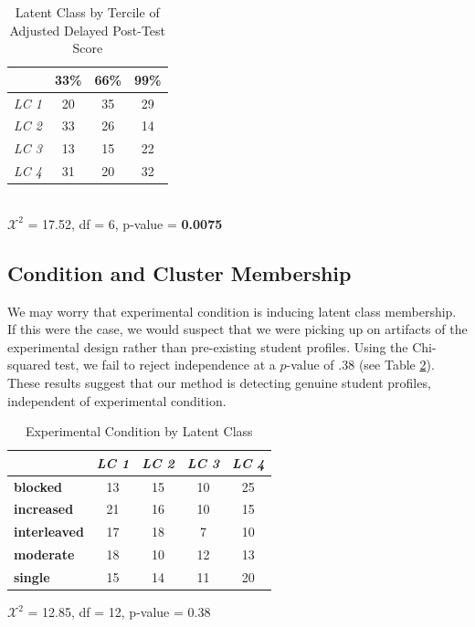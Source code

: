 \documentclass{edm_template}
\begin{document}
\begin{table}[hbtp]

\caption{Latent Class by Tercile of Adjusted Delayed Post-Test Score}
\begin{center}
\begin{tabular}{|l || c | c | c |}
\hline
&33\%&66\%&99\%\\ \hline \hline
  \emph{LC 1}  &   20& 35& 29 \\ \hline
  \emph{LC 2}&   33& 26& 14 \\ \hline
\emph{LC 3}& 13& 15& 22 \\ \hline
  \emph{LC 4} & 31& 20& 32 \\ \hline
 \end{tabular}
\\$\mathcal{X}^2$ = 17.52, df = 6, p-value = {\bf 0.0075}
\end{center}
\label{tab:lc-by-score}
\end{table}

\subsection{Condition and Cluster Membership}

We may worry that experimental condition is inducing latent class membership. If this were the case, we would suspect that we were picking up on artifacts of the experimental design rather than pre-existing student profiles. Using the Chi-squared test, we fail to reject independence at a $p$-value of $.38$ (see Table \ref{tab:exp-and-lc}). These results suggest that our method is detecting genuine student profiles, independent of experimental condition. 


\begin{table}[hbtp]
\centering

\begin{tabular}{|l || c | c | c | c |}
\hline
&\emph{LC 1}&\emph{LC 2}&\emph{LC 3}&\emph{LC 4}\\ \hline \hline
\textbf{blocked}&     13& 15& 10& 25\\ \hline
\textbf{increased}&   21& 16& 10& 15\\ \hline
\textbf{interleaved}& 17& 18&  7& 10\\ \hline
\textbf{moderate}&    18& 10& 12& 13\\ \hline
\textbf{single}&      15& 14& 11& 20\\ \hline
 \end{tabular}
 
 \begin{center} $\mathcal{X}^2$ = 12.85, df = 12, p-value = 0.38 \end{center}
\caption{Experimental Condition by Latent Class}
\label{tab:exp-and-lc}
\end{table}
\end{document}
